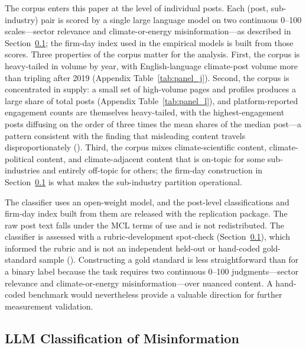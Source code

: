 \documentclass{article}
\theoremstyle{plain}
\begin{document}
The corpus enters this paper at the level of individual posts. Each (post, sub-industry) pair is scored by a single large language model on two continuous 0--100 scales---sector relevance and climate-or-energy misinformation---as described in Section~\ref{sec:LLM}; the firm-day index used in the empirical models is built from those scores. Three properties of the corpus matter for the analysis. First, the corpus is heavy-tailed in volume by year, with English-language climate-post volume more than tripling after 2019 (Appendix Table~\ref{tab:panel_j}). Second, the corpus is concentrated in supply: a small set of high-volume pages and profiles produces a large share of total posts (Appendix Table~\ref{tab:panel_l}), and platform-reported engagement counts are themselves heavy-tailed, with the highest-engagement posts diffusing on the order of three times the mean shares of the median post---a pattern consistent with the finding that misleading content travels disproportionately (\cite{VosoughiRoyAral2018}). Third, the corpus mixes climate-scientific content, climate-political content, and climate-adjacent content that is on-topic for some sub-industries and entirely off-topic for others; the firm-day construction in Section~\ref{sec:LLM} is what makes the sub-industry partition operational.

The classifier uses an open-weight model, and the post-level classifications and firm-day index built from them are released with the replication package. The raw post text falls under the MCL terms of use and is not redistributed. The classifier is assessed with a rubric-development spot-check (Section~\ref{sec:LLM}), which informed the rubric and is not an independent held-out or hand-coded gold-standard sample (\cite{grimmer2022text}). Constructing a gold standard is less straightforward than for a binary label because the task requires two continuous 0--100 judgments---sector relevance and climate-or-energy misinformation---over nuanced content. A hand-coded benchmark would nevertheless provide a valuable direction for further measurement validation.

\subsection{LLM Classification of Misinformation}
\label{sec:LLM}
\end{document}
